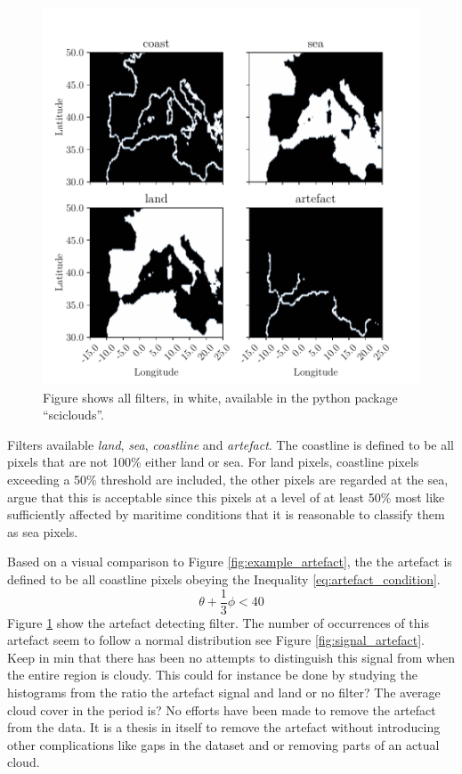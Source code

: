 \begin{figure}
    \centering
    \includegraphics{python_figs/filters.pdf}
    \caption{Figure shows all filters, in white, available in the python package ``sciclouds''.}
    \label{fig:filters_subplot}
\end{figure}
Filters available \textit{land}, \textit{sea}, \textit{coastline} and \textit{artefact}. The coastline is defined to be all pixels that are not 100\% either land or sea. For land pixels, coastline pixels exceeding a 50\% threshold are included, the other pixels are regarded at the sea, argue that this is acceptable since this pixels at a level of at least 50\% most like sufficiently affected by maritime conditions that it is reasonable to classify them as sea pixels.

Based on a visual comparison to Figure \ref{fig:example_artefact}, the the artefact is defined to be all coastline pixels obeying the Inequality \eqref{eq:artefact_condition}.
\begin{equation} \label{eq:artefact_condition}
    \theta + \frac{1}{3}\phi < 40
\end{equation}
Figure \ref{fig:filters_subplot} show the artefact detecting filter. 
The number of occurrences of this artefact seem to follow a normal distribution see Figure \ref{fig:signal_artefact}. Keep in min that there has been no attempts to distinguish this signal from when the entire region is cloudy. This could for instance be done by studying the histograms from the ratio the artefact signal and land or no filter? The average cloud cover in the period is? 
No efforts have been made to remove the artefact from the data. It is a thesis in itself to remove the artefact without introducing other complications like gaps in the dataset and or removing parts of an actual cloud.


